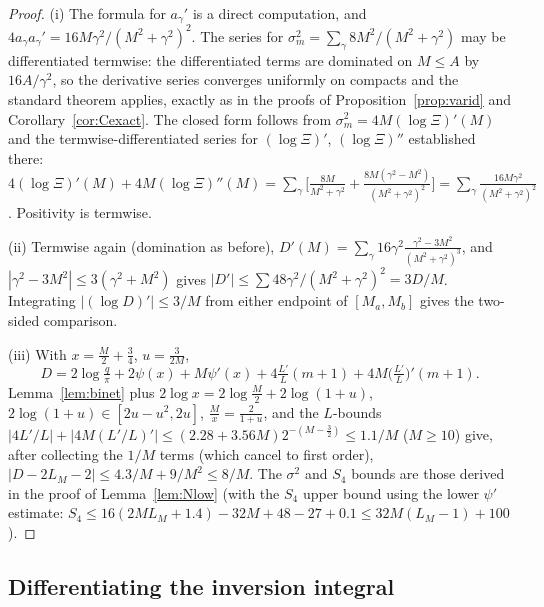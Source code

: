 \documentclass[11pt]{article}
\begin{document}
\begin{proof}
(i) The formula for $a_\gamma'$ is a direct computation, and
$4a_\gamma a_\gamma'=16M\gamma^2/(M^2+\gamma^2)^2$. The series for
$\sigma_m^2=\sum_\gamma8M^2/(M^2+\gamma^2)$ may be differentiated
termwise: the differentiated terms are dominated on $M\le A$ by
$16A/\gamma^2$, so the derivative series converges uniformly on
compacts and the standard theorem applies, exactly as in the proofs of
Proposition~\ref{prop:varid} and Corollary~\ref{cor:Cexact}. The
closed form follows from
$\sigma_m^2=4M(\log\Xi)'(M)$ and the termwise-differentiated series
for $(\log\Xi)'$, $(\log\Xi)''$ established there:
$4(\log\Xi)'(M)+4M(\log\Xi)''(M)
=\sum_\gamma\bigl[\tfrac{8M}{M^2+\gamma^2}
+\tfrac{8M(\gamma^2-M^2)}{(M^2+\gamma^2)^2}\bigr]
=\sum_\gamma\tfrac{16M\gamma^2}{(M^2+\gamma^2)^2}$. Positivity is
termwise.

(ii) Termwise again (domination as before),
$D'(M)=\sum_\gamma16\gamma^2\frac{\gamma^2-3M^2}{(M^2+\gamma^2)^3}$,
and $|\gamma^2-3M^2|\le3(\gamma^2+M^2)$ gives
$|D'|\le\sum48\gamma^2/(M^2+\gamma^2)^2=3D/M$. Integrating
$|(\log D)'|\le3/M$ from either endpoint of $[M_a,M_b]$ gives the
two-sided comparison.

(iii) With $x=\tfrac M2+\tfrac34$, $u=\tfrac3{2M}$,
\[
D=2\log\tfrac q\pi+2\psi(x)+M\psi'(x)
+4\tfrac{L'}{L}(m+1)+4M\bigl(\tfrac{L'}{L}\bigr)'(m+1) .
\]
Lemma~\ref{lem:binet} plus $2\log x=2\log\tfrac M2+2\log(1+u)$,
$2\log(1+u)\in[2u-u^2,2u]$, $\tfrac Mx=\tfrac2{1+u}$, and the
$L$-bounds $|4L'/L|+|4M(L'/L)'|\le(2.28+3.56M)2^{-(M-\frac32)}
\le1.1/M$ ($M\ge10$) give, after collecting the $1/M$ terms (which
cancel to first order),
$|D-2L_M-2|\le4.3/M+9/M^2\le8/M$. The $\sigma^2$ and $S_4$ bounds are
those derived in the proof of Lemma~\ref{lem:Nlow} (with the $S_4$
upper bound using the lower $\psi'$ estimate:
$S_4\le16(2ML_M+1.4)-32M+48-27+0.1\le32M(L_M-1)+100$).
\end{proof}

\subsection*{Differentiating the inversion integral}
\end{document}
